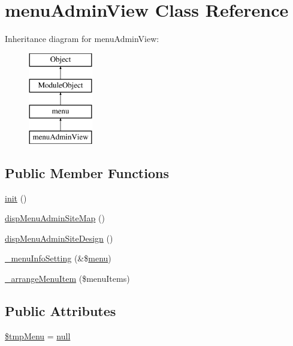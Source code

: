 \hypertarget{classmenuAdminView}{}\section{menu\+Admin\+View Class Reference}
\label{classmenuAdminView}
Inheritance diagram for menu\+Admin\+View\+:\begin{figure}[H]
\begin{center}
\leavevmode
\includegraphics[height=4.000000cm]{classmenuAdminView}
\end{center}
\end{figure}
\subsection*{Public Member Functions}
\begin{DoxyCompactItemize}
\item 
\hyperlink{classmenuAdminView_ae7bc53b51dbc5c57f396420ec4180db0}{init} ()
\item 
\hyperlink{classmenuAdminView_afa55cc43041d721b52b8504c3b34e625}{disp\+Menu\+Admin\+Site\+Map} ()
\item 
\hyperlink{classmenuAdminView_a29d653c99c2e86ed5b8324042ef447ba}{disp\+Menu\+Admin\+Site\+Design} ()
\item 
\hyperlink{classmenuAdminView_abbcdc54eb95b1c114d43c347fd1f1008}{\+\_\+menu\+Info\+Setting} (\&\$\hyperlink{classmenu}{menu})
\item 
\hyperlink{classmenuAdminView_a9ae9e6a8ade5abcef97bd946d4ca99f7}{\+\_\+arrange\+Menu\+Item} (\$menu\+Items)
\end{DoxyCompactItemize}
\subsection*{Public Attributes}
\begin{DoxyCompactItemize}
\item 
\hyperlink{classmenuAdminView_a50d98e62711bbf3f6326b4aab2bcb12a}{\$tmp\+Menu} = \hyperlink{modernizr_8min_8js_a286f9ec831c5e676eeb493248eab9575}{null}
\end{DoxyCompactItemize}


